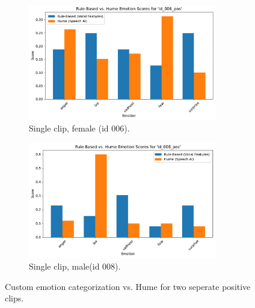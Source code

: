\begin{figure}[H]
    \centering
    \begin{subfigure}[t]{0.45\textwidth}
        \centering
        \includegraphics[width=0.9\textwidth]{png/results/rq1_nr3/id_006_pos_praat_hume_comparison.pdf}
        \caption{Single clip, female (id 006).}
        \label{fig:praat_hume_006_pos}
    \end{subfigure} 
    \begin{subfigure}[t]{0.45\textwidth}
        \centering
        \includegraphics[width=0.9\textwidth]{png/results/rq1_nr3/id_008_pos_praat_hume_comparison.pdf}
        \caption{Single clip, male(id 008).}
        \label{fig:praat_hume_008_pos}
    \end{subfigure} 
    \caption{Custom emotion categorization vs. Hume for two seperate positive clips.}
    \label{fig:rq1_praat_hume_pos}
\end{figure}

